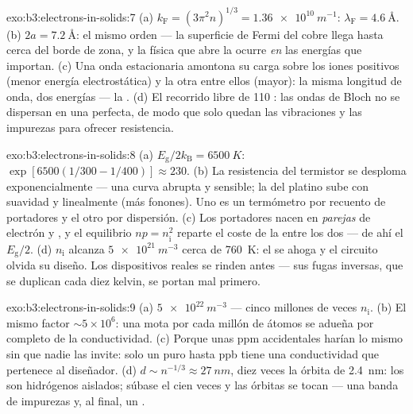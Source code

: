 \begin{solution}{exo:b3:electrons-in-solids:7}
(a) $k_{\text{F}} = (3\pi^2n)^{1/3} = \qty{1.36e10}{m^{-1}}$:
$\lambda_{\text{F}} = \qty{4.6}{\angstrom}$. (b) $2a =
\qty{7.2}{\angstrom}$: el mismo orden --- la superficie de Fermi del cobre
llega hasta cerca del borde de zona, y la física que abre la 
ocurre \emph{en} las energías que importan. (c) Una onda estacionaria
amontona su carga sobre los iones positivos (menor energía
electrostática) y la otra entre ellos (mayor): la misma longitud de onda, dos
energías --- la . (d) El recorrido libre de 110 :
las ondas de Bloch no se dispersan en una  perfecta, de modo que solo quedan
las vibraciones y las impurezas para ofrecer resistencia.
\end{solution}

\begin{solution}{exo:b3:electrons-in-solids:8}
(a) $E_{\text{g}}/2k_{\text{B}} = \qty{6500}{K}$:
$\exp[6500(1/300 - 1/400)] \approx 230$. (b) La resistencia del
termistor se desploma exponencialmente --- una curva abrupta y sensible;
la del platino sube con suavidad y linealmente (más fonones). Uno es un
termómetro por recuento de portadores y el otro por dispersión. (c)
Los portadores nacen en \emph{parejas} de electrón y , y el
equilibrio $np = n_{\text{i}}^2$ reparte el coste de la  entre
los dos --- de ahí el $E_{\text{g}}/2$. (d)
$n_{\text{i}}$ alcanza $\qty{5e21}{m^{-3}}$ cerca de \qty{760}{K}:
el  se ahoga y el circuito olvida su diseño. Los
dispositivos reales se rinden antes --- sus fugas inversas, que se duplican cada
diez kelvin, se portan mal primero.
\end{solution}

\begin{solution}{exo:b3:electrons-in-solids:9}
(a) $\qty{5e22}{m^{-3}}$ --- cinco millones de veces $n_{\text{i}}$.
(b) El mismo factor $\sim5\times10^6$: una mota por cada millón de
átomos se adueña por completo de la conductividad. (c) Porque unas ppm accidentales
harían lo mismo sin que nadie las invite: solo un  puro hasta ppb tiene una
conductividad que pertenece al diseñador. (d) $d \sim n^{-1/3}
\approx \qty{27}{nm}$, diez veces la órbita de \qty{2.4}{nm}: los 
son hidrógenos aislados; súbase el  cien veces y las
órbitas se tocan --- una banda de impurezas y, al final, un .
\end{solution}

